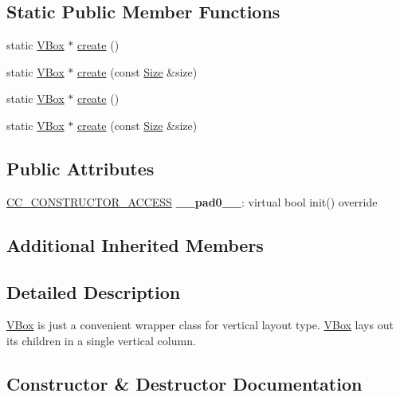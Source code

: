 \subsection*{Static Public Member Functions}
\begin{DoxyCompactItemize}
\item 
static \hyperlink{classui_1_1VBox}{V\+Box} $\ast$ \hyperlink{classui_1_1VBox_a3709266293eca4d349ed2cb3a4f259dc}{create} ()
\item 
static \hyperlink{classui_1_1VBox}{V\+Box} $\ast$ \hyperlink{classui_1_1VBox_afa217961ff5274400794dac3c138b43e}{create} (const \hyperlink{classSize}{Size} \&size)
\item 
static \hyperlink{classui_1_1VBox}{V\+Box} $\ast$ \hyperlink{classui_1_1VBox_af93ba3a9a5937bcbb4d3fbe12881c80f}{create} ()
\item 
static \hyperlink{classui_1_1VBox}{V\+Box} $\ast$ \hyperlink{classui_1_1VBox_afa217961ff5274400794dac3c138b43e}{create} (const \hyperlink{classSize}{Size} \&size)
\end{DoxyCompactItemize}
\subsection*{Public Attributes}
\begin{DoxyCompactItemize}
\item 
\mbox{\label{classui_1_1VBox_a369ff2efd3dce746cd18321dc65e20aa}} 
\hyperlink{_2cocos2d_2cocos_2base_2ccConfig_8h_a25ef1314f97c35a2ed3d029b0ead6da0}{C\+C\+\_\+\+C\+O\+N\+S\+T\+R\+U\+C\+T\+O\+R\+\_\+\+A\+C\+C\+E\+SS} {\bfseries \+\_\+\+\_\+pad0\+\_\+\+\_\+}\+: virtual bool init() override
\end{DoxyCompactItemize}
\subsection*{Additional Inherited Members}


\subsection{Detailed Description}
\hyperlink{classui_1_1VBox}{V\+Box} is just a convenient wrapper class for vertical layout type. \hyperlink{classui_1_1VBox}{V\+Box} lays out its children in a single vertical column. 

\subsection{Constructor \& Destructor Documentation}
\mbox{\label{classui_1_1VBox_a7aadb18ab5624f959f0ee49be744393f}} 
